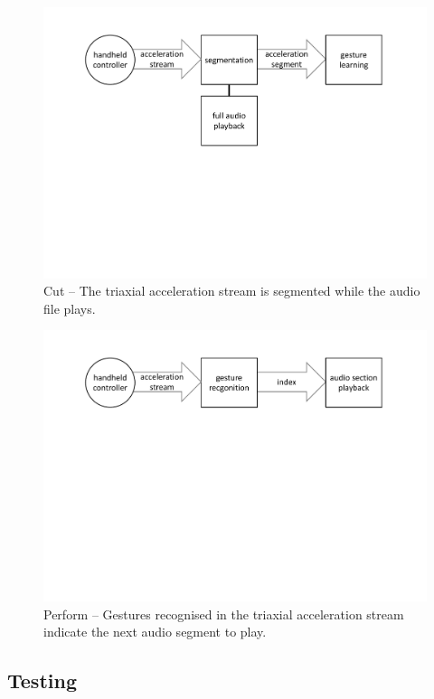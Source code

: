\documentclass{nime-alternate_MANUSCRIPT} %
\begin{document}
\begin{figure}[t!]
	\centering
		\includegraphics[trim={3.2cm 10.2cm 3.2cm 2.1cm}, clip=true, width=1\columnwidth]{cut}
	\caption{Cut -- The triaxial acceleration stream is segmented while the audio file plays.}
	\label{fig_3}
\end{figure}

\begin{figure}[t!]
\vspace{0.6cm}
	\centering
		\includegraphics[trim={3.2cm 14.9cm 3.2cm 2.1cm}, clip=true, width=1\columnwidth]{perform}
	\caption{Perform -- Gestures recognised in the triaxial acceleration stream indicate the next audio segment to play.}
	\label{fig_4}
\end{figure}

\subsection{Testing}\label{Testing}
\end{document}
